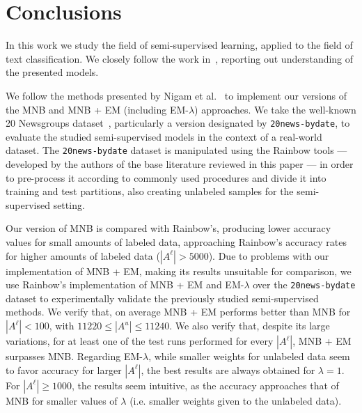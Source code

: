 \section{Conclusions}

In this work we study the field of semi-supervised learning, applied to the 
field of text classification. We closely follow the work in~\cite{McCallum98acomparison,Nigam2000}, reporting out 
understanding of the presented models.\vertbreak

We follow the methods presented by Nigam et al.~\cite{Nigam2000} to implement our 
versions of the MNB and MNB + EM (including EM-$\lambda$) approaches. We 
take the well-known 20 Newsgroups dataset~\cite{Lang95}, particularly 
a version designated by \verb+20news-bydate+, to evaluate the studied 
semi-supervised models in the context of a real-world dataset. The 
\verb+20news-bydate+ dataset is manipulated using the Rainbow tools --- developed 
by the authors of the base literature reviewed in this paper --- in order to 
pre-process it according to commonly used procedures and divide it 
into training and test partitions, also creating unlabeled samples for the 
semi-supervised setting.\vertbreak

Our version of MNB is compared with Rainbow's, producing lower accuracy values 
for small amounts of labeled data, approaching Rainbow's accuracy rates for 
higher amounts of labeled data ($|A^\ell| > 5000$). Due to problems with our 
implementation of MNB + EM, making its results unsuitable for comparison, we 
use Rainbow's implementation of MNB + EM and EM-$\lambda$ over the 
\verb+20news-bydate+ dataset to experimentally validate the previously studied 
semi-supervised methods. We verify that, on average MNB + EM performs better 
than MNB for $|A^\ell| < 100$, with $11220 \le |A^u| \le 11240$. We also verify that, 
despite its large variations, for at least one of the test runs performed 
for every $|A^\ell|$, MNB + EM surpasses MNB. Regarding EM-$\lambda$, while 
smaller weights for unlabeled data seem to favor accuracy for larger 
$|A^\ell|$, the best results are always obtained for $\lambda = 1$. For 
$|A^\ell| \ge 1000$, the results seem intuitive, as the accuracy approaches 
that of MNB for smaller values of $\lambda$ (i.e. smaller weights given to 
the unlabeled data).
